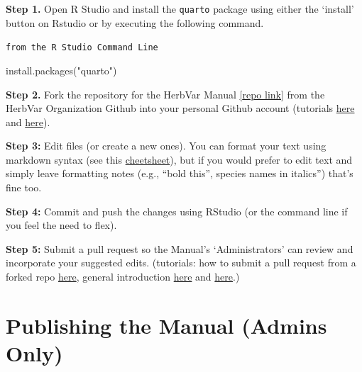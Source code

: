 \documentclass[
  letterpaper,
  DIV=11,
  numbers=noendperiod]{scrreprt}
\newenvironment{Shaded}{\begin{snugshade}}{\end{snugshade}}
\newcommand{\FunctionTok}[1]{\textcolor[rgb]{0.28,0.35,0.67}{#1}}
\newcommand{\NormalTok}[1]{\textcolor[rgb]{0.00,0.23,0.31}{#1}}
\newcommand{\StringTok}[1]{\textcolor[rgb]{0.13,0.47,0.30}{#1}}
\begin{document}
\textbf{Step 1.} Open R Studio and install the \texttt{quarto} package
using either the `install' button on Rstudio or by executing the
following command.

\begin{codelisting}

\caption{\texttt{from the R Studio Command Line}}

\begin{Shaded}
\begin{Highlighting}[]
\FunctionTok{install.packages}\NormalTok{(}\StringTok{"quarto"}\NormalTok{)}
\end{Highlighting}
\end{Shaded}

\end{codelisting}

\textbf{Step 2.} Fork the repository for the HerbVar Manual
\href{https://github.com/HerbVar-Network/herbvar_manual}{{[}repo
link{]}} from the HerbVar Organization Github into your personal Github
account (tutorials
\href{https://github.com/rstats-tln/fork-and-clone-repo}{here} and
\href{https://datacarpentry.org/rr-version-control/03-git-in-rstudio/}{here}).

\textbf{Step 3:} Edit files (or create a new ones). You can format your
text using markdown syntax (see this
\href{https://rstudio.github.io/cheatsheets/html/rmarkdown.html}{cheetsheet}),
but if you would prefer to edit text and simply leave formatting notes
(e.g., ``bold this'', species names in italics'') that's fine too.

\textbf{Step 4:} Commit and push the changes using RStudio (or the
command line if you feel the need to flex).

\textbf{Step 5:} Submit a pull request so the Manual's `Administrators'
can review and incorporate your suggested edits. (tutorials: how to
submit a pull request from a forked repo
\href{https://docs.github.com/en/pull-requests/collaborating-with-pull-requests/proposing-changes-to-your-work-with-pull-requests/creating-a-pull-request-from-a-fork}{here},
general introduction
\href{https://docs.github.com/en/pull-requests/collaborating-with-pull-requests/proposing-changes-to-your-work-with-pull-requests/creating-a-pull-request}{here}
and
\href{https://gcapes.github.io/swc-pr-tutorial/01-git-collaboration/index.html}{here}.)

\section{Publishing the Manual (Admins
Only)}\label{publishing-the-manual-admins-only}
\end{document}
